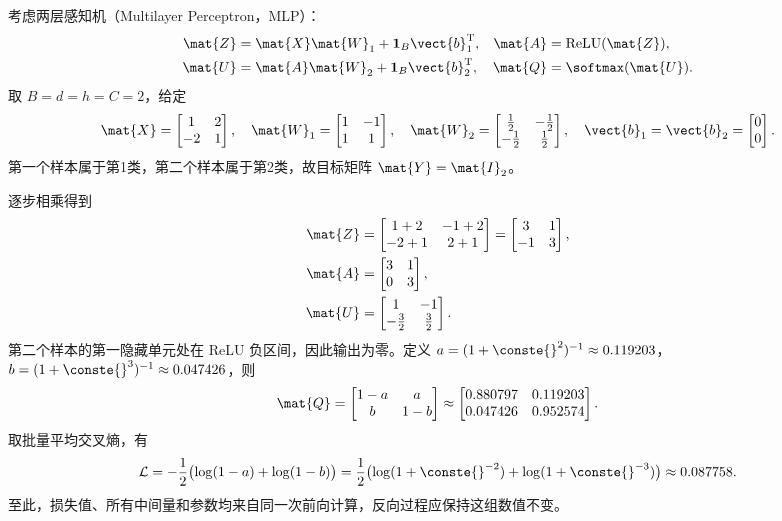 \documentclass[../textbook.tex]{subfiles}
\begin{document}
\begin{example}
考虑两层感知机（Multilayer Perceptron，MLP）：
\begin{align*}
 \mat{Z} &= \mat{X}\mat{W}_1+\mathbf1_B\vect{b}_1^{\mathrm{T}}, & \mat{A} &= \operatorname{ReLU}(\mat{Z}), \\
 \mat{U} &= \mat{A}\mat{W}_2+\mathbf1_B\vect{b}_2^{\mathrm{T}}, & \mat{Q} &= \softmax(\mat{U}).
\end{align*}
取 $B=d=h=C=2$，给定
\begin{equation*}
 \mat{X}=\begin{bmatrix}1&2\\-2&1\end{bmatrix},\quad
 \mat{W}_1=\begin{bmatrix}1&-1\\1&1\end{bmatrix},\quad
 \mat{W}_2=\begin{bmatrix}\frac{1}{2}&-\frac{1}{2}\\-\frac{1}{2}&\frac{1}{2}\end{bmatrix},
 \quad \vect{b}_1=\vect{b}_2=\begin{bmatrix}0\\0\end{bmatrix}.
\end{equation*}
第一个样本属于第1类，第二个样本属于第2类，故目标矩阵 $\mat{Y}=\mat{I}_2$。

逐步相乘得到
\begin{align*}
 \mat{Z}&=\begin{bmatrix}1+2&-1+2\\-2+1&2+1\end{bmatrix}
   =\begin{bmatrix}3&1\\-1&3\end{bmatrix},\\
 \mat{A}&=\begin{bmatrix}3&1\\0&3\end{bmatrix},\\
 \mat{U}&=\begin{bmatrix}1&-1\\-\frac{3}{2}&\frac{3}{2}\end{bmatrix}.
\end{align*}
第二个样本的第一隐藏单元处在 ReLU 负区间，因此输出为零。定义
$a=(1+\conste{}^2)^{-1}\approx0.119203$，$b=(1+\conste{}^3)^{-1}\approx0.047426$，则
\begin{equation*}
 \mat{Q}=\begin{bmatrix}1-a&a\\b&1-b\end{bmatrix}
 \approx\begin{bmatrix}0.880797&0.119203\\0.047426&0.952574\end{bmatrix}.
\end{equation*}
取批量平均交叉熵，有
\begin{equation*}
 \mathcal L=-\frac12\bigl(\log(1-a)+\log(1-b)\bigr)
 =\frac12\bigl(\log(1+\conste{}^{-2})+\log(1+\conste{}^{-3})\bigr)
 \approx0.087758.
\end{equation*}
至此，损失值、所有中间量和参数均来自同一次前向计算，反向过程应保持这组数值不变。


\end{example}
\end{document}
